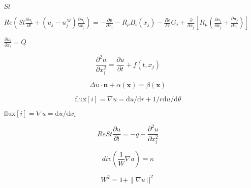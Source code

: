 \documentclass{article}
\begin{document}
$St$
\pagebreak

$ { Re \left( St \frac{\partial u_i}{\partial t}+ (u_j-u_j^{M}) \frac{\partial u_i}{\partial x_j} \right)= -\frac{\partial p}{\partial x_i} -R_\rho B_i(x_j) - \frac{Re}{Fr} G_i + \frac{\partial }{\partial x_j} \left[ R_\mu \left( \frac{\partial u_i}{\partial x_j}+ \frac{\partial u_j}{\partial x_i} \right) \right] } $
\pagebreak

$ { \frac{\partial u_i}{\partial x_i}=Q } $
\pagebreak

\[ \frac{\partial^2 u}{\partial x_i^2}=\frac{\partial u}{\partial t}+f(t,x_j) \]
\pagebreak

\[ \Delta u \cdot \mathbf{n} + \alpha (\mathbf{x}) = \beta (\mathbf{x}) \]
\pagebreak

\[ \mbox{flux}[i] = \nabla u = \mbox{d}u / \mbox{d} r + 1/r \mbox{d}u / \mbox{d} \theta \]
\pagebreak

$ \mbox{flux}[i] = \nabla u = \mbox{d}u / \mbox{d}x_i $
\pagebreak

\[ Re St \frac{\partial u}{\partial t} = - g + \frac{\partial^2 u}{\partial x_i^2} \]
\pagebreak

\[ div (\frac{1}{W} \nabla u) = \kappa \]
\pagebreak

\[ W^2=1+\|\nabla u\|^2 \]
\pagebreak
\end{document}

